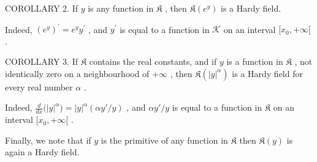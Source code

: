COROLLARY 2. If \(y\) is any function in \(\mathfrak{K}\) , then \(\mathfrak{K}(e^y)\) is a Hardy field.

Indeed, \(\left(e^{y}\right)^{\prime} = e^{y}y^{\prime}\) , and \(y^\prime\) is equal to a function in \(\mathcal{K}\) on an interval \([x_0, +\infty[\) .

COROLLARY 3. If \(\mathfrak{K}\) contains the real constants, and if \(y\) is a function in \(\mathfrak{K}\) , not identically zero on a neighbourhood of \(+\infty\) , then \(\mathfrak{K}(|y|^{\alpha})\) is a Hardy field for every real number \(\alpha\) .

Indeed, \(\frac{d}{dx}\big(|y|^{\alpha}\big) = |y|^{\alpha}(\alpha y'/y)\) , and \(\alpha y'/y\) is equal to a function in \(\mathfrak{K}\) on an interval \([x_0, +\infty[\) .

Finally, we note that if \(y\) is the primitive of any function in \(\mathfrak{K}\) then \(\mathfrak{K}(y)\) is again a Hardy field.

